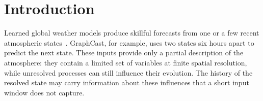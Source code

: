 \documentclass{article}
\begin{document}
\section{Introduction}



{Learned global weather models produce skillful forecasts from one or a few recent atmospheric states~\citep{bi2023pangu,lam2023graphcast,chen2023fuxi}. GraphCast, for example, uses two states six hours apart to predict the next state. These inputs provide only a partial description of the atmosphere: they contain a limited set of variables at finite spatial resolution, while unresolved processes can still influence their evolution. The history of the resolved state may carry information about these influences that a short input window does not capture.}
\end{document}
